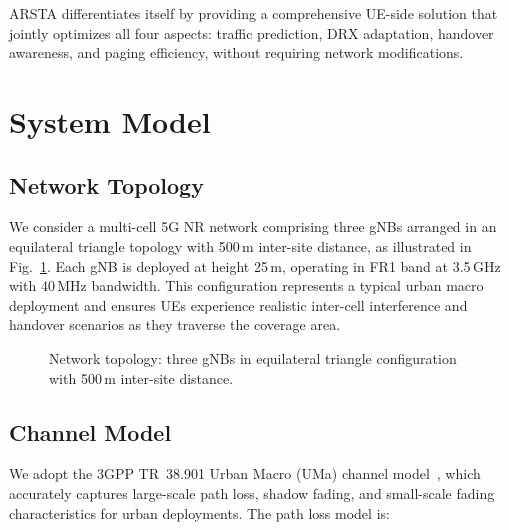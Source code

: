 \documentclass[conference]{IEEEtran}
\begin{document}
ARSTA differentiates itself by providing a comprehensive UE-side solution that jointly optimizes all four aspects: traffic prediction, DRX adaptation, handover awareness, and paging efficiency, without requiring network modifications.

\section{System Model}
\label{sec:system_model}

\subsection{Network Topology}
\label{subsec:topology}

We consider a multi-cell 5G NR network comprising three gNBs arranged in an equilateral triangle topology with 500\,m inter-site distance, as illustrated in Fig.~\ref{fig:topology}. Each gNB is deployed at height 25\,m, operating in FR1 band at 3.5\,GHz with 40\,MHz bandwidth. This configuration represents a typical urban macro deployment and ensures UEs experience realistic inter-cell interference and handover scenarios as they traverse the coverage area.

\begin{figure}[t]
    \centering
    \caption{Network topology: three gNBs in equilateral triangle configuration with 500\,m inter-site distance.}
    \label{fig:topology}
\end{figure}

\subsection{Channel Model}
\label{subsec:channel}

We adopt the 3GPP TR~38.901 Urban Macro (UMa) channel model~\cite{3GPPTS38331}, which accurately captures large-scale path loss, shadow fading, and small-scale fading characteristics for urban deployments. The path loss model is:
\end{document}
